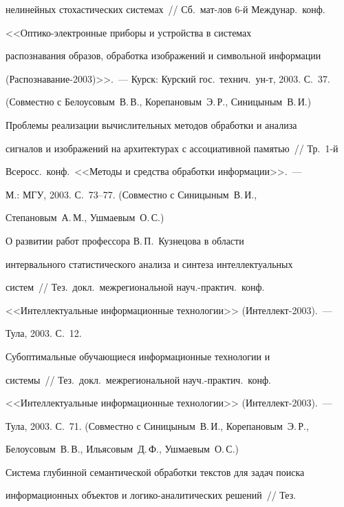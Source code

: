 нелинейных стохастических системах~// Сб.\ мат-лов 6-й Междунар.\ конф.\


 <<Оптико-электронные приборы и устройства в системах


распознавания образов, обработка изображений и символьной информации


(Распознавание-2003)>>.~--- Курск: Курский гос.\ технич.\ ун-т, 2003. С.~37.


(Совместно с Белоусовым~В.\,В., Корепановым~Э.\,Р., Синицыным~В.\,И.)





 Проблемы реализации вычислительных методов обработки и анализа


сигналов и изображений на архитектурах с ассоциативной памятью~// Тр.\ 1-й


Всеросс.\ конф.\ <<Методы и средства обработки информации>>.~---


М.: МГУ, 2003. С.~73--77. (Совместно с Синицыным~В.\,И.,


Степановым~А.\,М., Ушмаевым~О.\,С.)





 О развитии работ профессора В.\,П.~Кузнецова в области


интервального статистического анализа и синтеза интеллектуальных


систем~// Тез.\ докл.\ межрегиональной науч.-практич.\ конф.\


<<Интеллектуальные информационные технологии>> (Интеллект-2003).~---


Тула, 2003. С.~12.





 Субоптимальные обучающиеся информационные технологии и


системы~// Тез.\ докл.\ межрегиональной науч.-практич.\ конф.\


<<Интеллектуальные информационные технологии>> (Ин\-тел\-лект-2003).~---


Тула, 2003. С.~71. (Совместно с Синицыным~В.\,И., Корепановым~Э.\,Р.,


Белоусовым~В.\,В., Ильясовым~Д.\,Ф., Ушмаевым~О.\,С.)





 Система глубинной семантической обработки текстов для задач поиска


информационных объектов и логико-аналитических решений~// Тез.\


